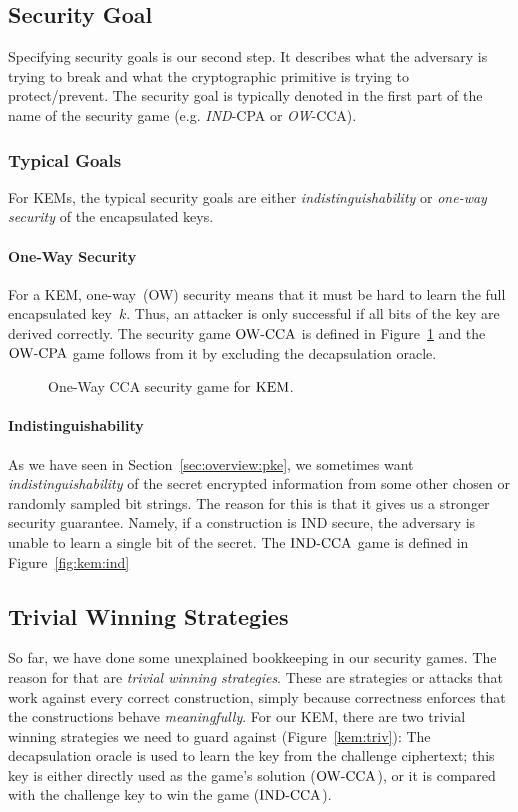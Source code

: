 \subsection{Security Goal}
Specifying security goals is our second step.
It describes what the adversary is trying to break and what the cryptographic primitive is trying to protect/prevent.
The security goal is typically denoted in the first part of the name of the security game (e.g. \emph{IND}-CPA or \emph{OW}-CCA).

\subsubsection{Typical Goals}
For KEMs, the typical security goals are either \emph{indistinguishability} or \emph{one-way security} of the encapsulated keys.

\paragraph{One-Way Security}
For a KEM, one-way~(OW) security means that it must be hard to learn the full encapsulated key~$k$.
Thus, an attacker is only successful if all bits of the key are derived correctly.
The security game ${\mathrm{OW}\text{-}\mathrm{CCA}}$ is defined in Figure~\ref{fig:kem:ow:cca} and the ${\mathrm{OW}\text{-}\mathrm{CPA}}$ game follows from it by excluding the decapsulation oracle.

\begin{figure}[!ht]
    \centering
    \nicoresetlinenr%
    \fbox{%
        \scalebox{\codescalefactor}{%
        }%
    }
    \caption{%
        One-Way CCA security game for $\mathrm{KEM}$.
    }
    \label{fig:kem:ow:cca}
\end{figure}

\paragraph{Indistinguishability}
As we have seen in Section~\ref{sec:overview:pke}, we sometimes want \emph{indistinguishability} of the secret encrypted information from some other chosen or randomly sampled bit strings.
The reason for this is that it gives us a stronger security guarantee. 
Namely, if a construction is IND secure, the adversary is unable to learn a single bit of the secret.
The ${\mathrm{IND}\text{-}\mathrm{CCA}}$ game is defined in Figure~\ref{fig:kem:ind}

\subsection{Trivial Winning Strategies}\label{sec:kem:trivial_attacks}
So far, we have done some unexplained bookkeeping in our security games. The reason for that are \emph{trivial winning strategies}.
These are strategies or attacks that work against every correct construction, simply because correctness enforces that the constructions behave \emph{meaningfully}.
For our KEM, there are two trivial winning strategies we need to guard against (Figure~\ref{kem:triv}):
The decapsulation oracle is used to learn the key from the challenge ciphertext; this key is either directly used as the game's solution (${\mathrm{OW}\text{-}\mathrm{CCA}}$), or it is compared with the challenge key to win the game (${\mathrm{IND}\text{-}\mathrm{CCA}}$).

